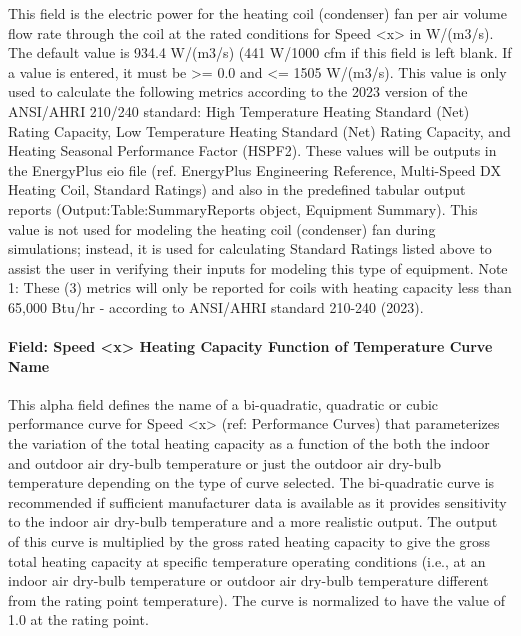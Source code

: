 This field is the electric power for the heating coil (condenser) fan per air volume flow rate through the coil at the rated conditions for Speed \textless{}x\textgreater{} in W/(m3/s). The default value is 934.4 W/(m3/s) (441 W/1000 cfm if this field is left blank. If a value is entered, it must be \textgreater{}= 0.0 and \textless{}= 1505 W/(m3/s). This value is only used to calculate the following metrics according to the 2023 version of the ANSI/AHRI 210/240 standard: High Temperature Heating Standard (Net) Rating Capacity, Low Temperature Heating Standard (Net) Rating Capacity, and Heating Seasonal Performance Factor (HSPF2). These values will be outputs in the EnergyPlus eio file (ref. EnergyPlus Engineering Reference, Multi-Speed DX Heating Coil, Standard Ratings) and also in the predefined tabular output reports (Output:Table:SummaryReports object, Equipment Summary). This value is not used for modeling the heating coil (condenser) fan during simulations; instead, it is used for calculating Standard Ratings listed above to assist the user in verifying their inputs for modeling this type of equipment.
Note 1: These (3) metrics will only be reported for coils with heating capacity less than 65,000 Btu/hr - according to ANSI/AHRI standard 210-240 (2023).

\paragraph{Field: Speed \textless{}x\textgreater{} Heating Capacity Function of Temperature Curve Name}\label{field-speed-x-heating-capacity-function-of-temperature-curve-name}

This alpha field defines the name of a bi-quadratic, quadratic or cubic performance curve for Speed \textless{}x\textgreater{} (ref: Performance Curves) that parameterizes the variation of the total heating capacity as a function of the both the indoor and outdoor air dry-bulb temperature or just the outdoor air dry-bulb temperature depending on the type of curve selected. The bi-quadratic curve is recommended if sufficient manufacturer data is available as it provides sensitivity to the indoor air dry-bulb temperature and a more realistic output. The output of this curve is multiplied by the gross rated heating capacity to give the gross total heating capacity at specific temperature operating conditions (i.e., at an indoor air dry-bulb temperature or outdoor air dry-bulb temperature different from the rating point temperature). The curve is normalized to have the value of 1.0 at the rating point.

